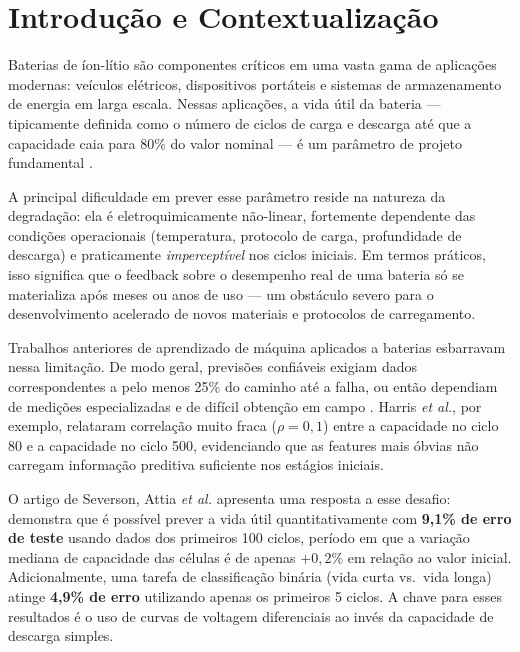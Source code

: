 \documentclass[12pt, a4paper]{article}
\begin{document}
\newpage
\tableofcontents
\newpage

\section{Introdução e Contextualização}

Baterias de íon-lítio são componentes críticos em uma vasta gama de
aplicações modernas: veículos elétricos, dispositivos portáteis e sistemas
de armazenamento de energia em larga escala. Nessas aplicações, a vida útil
da bateria --- tipicamente definida como o número de ciclos de carga e
descarga até que a capacidade caia para 80\% do valor nominal --- é um
parâmetro de projeto fundamental \cite{severson2019}.

A principal dificuldade em prever esse parâmetro reside na natureza da
degradação: ela é eletroquimicamente não-linear, fortemente dependente das
condições operacionais (temperatura, protocolo de carga, profundidade de
descarga) e praticamente \emph{imperceptível} nos ciclos iniciais. Em
termos práticos, isso significa que o feedback sobre o desempenho real de
uma bateria só se materializa após meses ou anos de uso --- um obstáculo
severo para o desenvolvimento acelerado de novos materiais e protocolos de
carregamento.

Trabalhos anteriores de aprendizado de máquina aplicados a baterias
esbarravam nessa limitação. De modo geral, previsões confiáveis exigiam
dados correspondentes a pelo menos 25\% do caminho até a falha, ou então
dependiam de medições especializadas e de difícil obtenção em campo
\cite{severson2019}. Harris \textit{et al.}, por exemplo, relataram
correlação muito fraca ($\rho = 0{,}1$) entre a capacidade no ciclo 80 e a
capacidade no ciclo 500, evidenciando que as features mais óbvias não
carregam informação preditiva suficiente nos estágios iniciais.

O artigo de Severson, Attia \textit{et al.} \cite{severson2019} apresenta
uma resposta a esse desafio: demonstra que é possível prever a vida útil
quantitativamente com \textbf{9,1\% de erro de teste} usando dados dos
primeiros 100 ciclos, período em que a variação mediana de capacidade das
células é de apenas $+0{,}2\%$ em relação ao valor inicial. Adicionalmente,
uma tarefa de classificação binária (vida curta vs.\ vida longa) atinge
\textbf{4,9\% de erro} utilizando apenas os primeiros 5 ciclos. A chave
para esses resultados é o uso de curvas de voltagem diferenciais ao invés
da capacidade de descarga simples.
\end{document}
